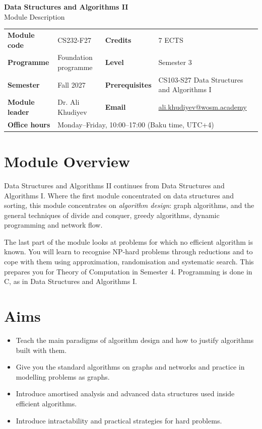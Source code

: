 \documentclass[11pt,a4paper]{article}
\makeatletter
\newcommand{\ModuleTitle}{Data Structures and Algorithms II}
\newcommand{\ModuleCode}{CS232-F27}
\newcommand{\Programme}{Foundation programme}
\newcommand{\Level}{Semester 3}
\newcommand{\Semester}{Fall 2027}
\newcommand{\Credits}{7 ECTS}
\newcommand{\ModuleLeader}{Dr. Ali Khudiyev}
\newcommand{\Email}{ali.khudiyev@wosm.academy}
\newcommand{\OfficeHours}{Monday--Friday, 10:00--17:00 (Baku time, UTC+4)}
\newcommand{\Prerequisites}{CS103-S27 Data Structures and Algorithms I}
\makeatother
\begin{document}
\begin{center}
  {\LARGE\bfseries\color{accent} \ModuleTitle}\\[4pt]
  {\large Module Description}
\end{center}
\vspace{6pt}

\begin{tabularx}{\textwidth}{>{\bfseries}l X >{\bfseries}l X}
\toprule
Module code   & \ModuleCode    & Credits      & \Credits \\
Programme     & \Programme     & Level        & \Level \\
Semester      & \Semester      & Prerequisites & \Prerequisites \\
Module leader & \ModuleLeader  & Email        & \href{mailto:\Email}{\Email} \\
Office hours  & \multicolumn{3}{l}{\OfficeHours} \\
\bottomrule
\end{tabularx}

\section{Module Overview}
Data Structures and Algorithms II continues from Data Structures and Algorithms I.
Where the first module concentrated on data structures and sorting, this module
concentrates on \emph{algorithm design}: graph algorithms, and the general techniques
of divide and conquer, greedy algorithms, dynamic programming and network flow.

The last part of the module looks at problems for which no efficient algorithm is
known. You will learn to recognise NP-hard problems through reductions and to cope
with them using approximation, randomisation and systematic search. This prepares
you for Theory of Computation in Semester 4. Programming is done in C, as in Data
Structures and Algorithms I.

\section{Aims}
\begin{itemize}
  \item Teach the main paradigms of algorithm design and how to justify algorithms built with them.
  \item Give you the standard algorithms on graphs and networks and practice in modelling problems as graphs.
  \item Introduce amortised analysis and advanced data structures used inside efficient algorithms.
  \item Introduce intractability and practical strategies for hard problems.
\end{itemize}
\end{document}
